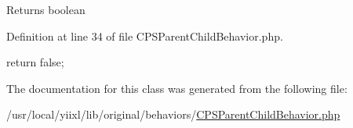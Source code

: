 \begin{DoxyReturn}{Returns}
boolean 
\end{DoxyReturn}


Definition at line 34 of file CPSParentChildBehavior.php.




\begin{DoxyCode}
    {
        return false;
    }
\end{DoxyCode}




The documentation for this class was generated from the following file:\begin{DoxyCompactItemize}
\item 
/usr/local/yiixl/lib/original/behaviors/\hyperlink{CPSParentChildBehavior_8php}{CPSParentChildBehavior.php}\end{DoxyCompactItemize}
